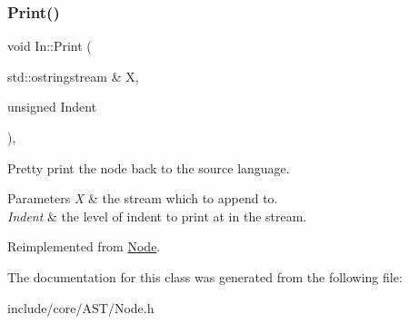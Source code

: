 \subsubsection{\texorpdfstring{Print()}{Print()}}
{\footnotesize\ttfamily void In\+::\+Print (\begin{DoxyParamCaption}\item[{std\+::ostringstream \&}]{X,  }\item[{unsigned}]{Indent }\end{DoxyParamCaption})\hspace{0.3cm}{\ttfamily [override]}, {\ttfamily [virtual]}}

Pretty print the node back to the source language. 
\begin{DoxyParams}{Parameters}
{\em X} & the stream which to append to. \\
\hline
{\em Indent} & the level of indent to print at in the stream. \\
\hline
\end{DoxyParams}


Reimplemented from \mbox{\hyperlink{class_node_a5325b760a6e6fe94227c0cff53af2c45}{Node}}.



The documentation for this class was generated from the following file\+:\begin{DoxyCompactItemize}
\item 
include/core/\+A\+S\+T/Node.\+h\end{DoxyCompactItemize}
